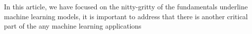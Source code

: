 In this article, we have focused on the nitty-gritty of the fundamentals underline machine learning models, it is important to address that there is another critical part of the any machine learning applications 